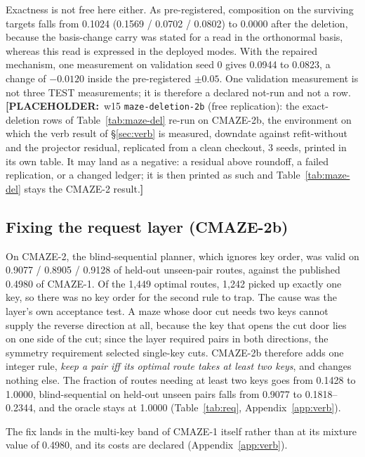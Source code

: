 \documentclass{article} %
\newcommand{\PLACEHOLDER}[1]{{\color{red}\textbf{[PLACEHOLDER:}~#1\textbf{]}}}
\begin{document}
\noindent Exactness is not free here either. As pre-registered, composition on the surviving
targets falls from 0.1024 (0.1569 / 0.0702 / 0.0802) to 0.0000 after the deletion, because the
basis-change carry was stated for a read in the orthonormal basis, whereas this read is expressed
in the deployed modes. With the repaired mechanism, one measurement on validation seed 0 gives
0.0944 to 0.0823, a change of $-0.0120$ inside the pre-registered $\pm0.05$. One validation
measurement is not three TEST measurements; it is therefore a declared not-run and not a row.
\PLACEHOLDER{w15 \texttt{maze-deletion-2b} (free replication): the exact-deletion rows of
Table~\ref{tab:maze-del} re-run on CMAZE-2b, the environment on which the verb result of
\S\ref{sec:verb} is measured, downdate against refit-without and the projector residual,
replicated from a clean checkout, 3 seeds, printed in its own table. It may land as a
negative: a residual above roundoff, a failed replication, or a changed ledger; it is then
printed as such and Table~\ref{tab:maze-del} stays the CMAZE-2 result.}

\subsection{Fixing the request layer (CMAZE-2b)}
\label{sec:req-layer}

On CMAZE-2, the blind-sequential planner, which ignores key order, was valid on 0.9077 /
0.8905 / 0.9128 of held-out unseen-pair routes, against the published 0.4980 of CMAZE-1. Of
the 1,449 optimal routes, 1,242 picked up exactly one key, so there was no key order for the
second rule to trap. %
The cause was the layer's own acceptance test. A maze whose door cut needs two keys cannot
supply the reverse direction at all, because the key that opens the cut door lies on one side
of the cut; since the layer required pairs in both directions, the symmetry requirement selected
single-key cuts. %
CMAZE-2b therefore adds one integer rule, \emph{keep a pair iff its optimal route takes at least
two keys}, and changes nothing else. The fraction of routes needing at least two keys goes from
0.1428 to 1.0000, blind-sequential on held-out unseen pairs falls from 0.9077 to 0.1818--0.2344,
and the oracle stays at 1.0000 (Table~\ref{tab:req}, Appendix~\ref{app:verb}). %

The fix lands in the multi-key band of CMAZE-1 itself rather than at its mixture value of 0.4980, and %
its costs are declared (Appendix~\ref{app:verb}).
\end{document}
